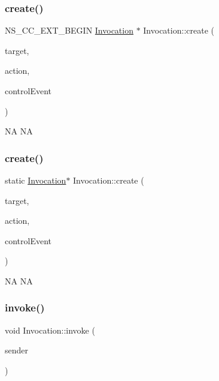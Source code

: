 \subsubsection{\texorpdfstring{create()}{create()}\hspace{0.1cm}{\footnotesize\ttfamily [1/2]}}
{\footnotesize\ttfamily N\+S\+\_\+\+C\+C\+\_\+\+E\+X\+T\+\_\+\+B\+E\+G\+IN \hyperlink{classInvocation}{Invocation} $\ast$ Invocation\+::create (\begin{DoxyParamCaption}\item[{\hyperlink{classRef}{Ref} $\ast$}]{target,  }\item[{Control\+::\+Handler}]{action,  }\item[{Control\+::\+Event\+Type}]{control\+Event }\end{DoxyParamCaption})\hspace{0.3cm}{\ttfamily [static]}}

NA  NA \mbox{\label{classInvocation_aaea5961364e51971202ad2823424a84f}} 
\subsubsection{\texorpdfstring{create()}{create()}\hspace{0.1cm}{\footnotesize\ttfamily [2/2]}}
{\footnotesize\ttfamily static \hyperlink{classInvocation}{Invocation}$\ast$ Invocation\+::create (\begin{DoxyParamCaption}\item[{\hyperlink{classRef}{Ref} $\ast$}]{target,  }\item[{Control\+::\+Handler}]{action,  }\item[{Control\+::\+Event\+Type}]{control\+Event }\end{DoxyParamCaption})\hspace{0.3cm}{\ttfamily [static]}}

NA  NA \mbox{\label{classInvocation_a4f3ed4c727f5737ba2fe94df53bd4a37}} 
\subsubsection{\texorpdfstring{invoke()}{invoke()}\hspace{0.1cm}{\footnotesize\ttfamily [1/2]}}
{\footnotesize\ttfamily void Invocation\+::invoke (\begin{DoxyParamCaption}\item[{\hyperlink{classRef}{Ref} $\ast$}]{sender }\end{DoxyParamCaption})}

